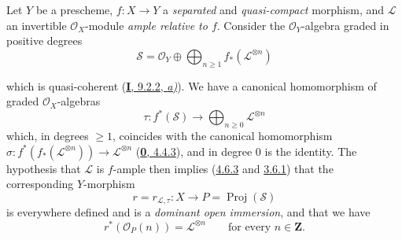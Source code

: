 \begin{env}[8.8.1]
\label{II.8.8.1}
Let $Y$ be a prescheme, $f:X\to Y$ a \emph{separated} and \emph{quasi-compact}
morphism, and $\mathcal{L}$ an invertible $\mathcal{O}_X$-module \emph{ample
relative to $f$}. Consider the $\mathcal{O}_Y$-algebra graded in positive
degrees
\begin{equation}
\label{II.8.8.1.1}
  \mathcal{S}=\mathcal{O}_Y\oplus
  \bigoplus_{n\geqslant 1}f_*(\mathcal{L}^{\otimes n})
\tag{8.8.1.1}
\end{equation}

which is quasi-coherent (\hyperref[I.9.2.2]{\textbf{I}, 9.2.2, \emph{a)}}). We have a
canonical homomorphism of graded $\mathcal{O}_X$-algebras
\begin{equation}
\label{II.8.8.1.2}
  \tau:f^*(\mathcal{S})\longrightarrow
  \bigoplus_{n\geqslant 0}\mathcal{L}^{\otimes n}
\tag{8.8.1.2}
\end{equation}
which, in degrees $\geqslant 1$, coincides with the canonical homomorphism
$\sigma:f^*(f_*(\mathcal{L}^{\otimes n}))\to\mathcal{L}^{\otimes n}$
(\hyperref[0.4.4.3]{\textbf{0}, 4.4.3}), and in degree $0$ is the identity.
The hypothesis that $\mathcal{L}$ is $f$-ample then implies
(\hyperref[II.4.6.3]{4.6.3} and \hyperref[II.3.6.1]{3.6.1}) that the
corresponding $Y$-morphism
\begin{equation}
\label{II.8.8.1.3}
  r=r_{\mathcal{L},\tau}:X\longrightarrow
  P=\operatorname{Proj}(\mathcal{S})
\tag{8.8.1.3}
\end{equation}
is everywhere defined and is a \emph{dominant open immersion}, and that we
have
\begin{equation}
\label{II.8.8.1.4}
  r^*(\mathcal{O}_P(n))=\mathcal{L}^{\otimes n}
  \qquad\text{for every }n\in\mathbf{Z}.
\tag{8.8.1.4}
\end{equation}
\end{env}

